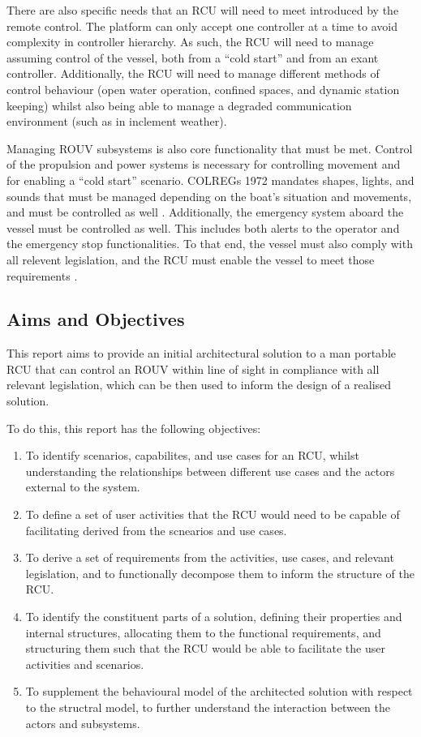 \documentclass[../main.tex]{subfiles}
\begin{document}
There are also specific needs that an RCU will need to meet introduced by the remote control.
The platform can only accept one controller at a time to avoid complexity in controller hierarchy.
As such, the RCU will need to manage assuming control of the vessel, both from a ``cold start'' and from an exant controller.
Additionally, the RCU will need to manage different methods of control behaviour (open water operation, confined spaces, and dynamic station keeping) whilst also being able to manage a degraded
communication environment (such as in inclement weather).

Managing ROUV subsystems is also core functionality that must be met.
Control of the propulsion and power systems is necessary for controlling movement and for enabling a ``cold start'' scenario.
COLREGs 1972 mandates shapes, lights, and sounds that must be managed depending on the boat's situation and movements, and must be controlled as well \cite{COLREGS1972}.
Additionally, the emergency system aboard the vessel must be controlled as well.
This includes both alerts to the operator and the emergency stop functionalities.
To that end, the vessel must also comply with all relevent legislation, and the RCU must enable the vessel to meet those requirements \cite{WBC3} \cite{COLREGS1972}.


\subsection{Aims and Objectives}

This report aims to provide an initial architectural solution to a man portable RCU that can control an ROUV within line of sight in compliance with all relevant legislation, which can be then used to inform the design of a realised solution.

To do this, this report has the following objectives:
\begin{enumerate}
    \item{} To identify scenarios, capabilites, and use cases for an RCU, whilst understanding the relationships between different use cases and the actors external to the system.
    \item{} To define a set of user activities that the RCU would need to be capable of facilitating derived from the scnearios and use cases.
    \item{} To derive a set of requirements from the activities, use cases, and relevant legislation, and to functionally decompose them to inform the structure of the RCU.
    \item{} To identify the constituent parts of a solution, defining their properties and internal structures, allocating them to the functional requirements, and structuring them such that the RCU would be able to facilitate the user activities and scenarios.
    \item{} To supplement the behavioural model of the architected solution with respect to the structral model, to further understand the interaction between the actors and subsystems.
\end{enumerate}
\end{document}
